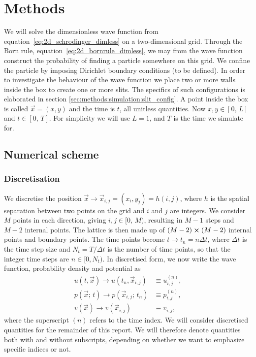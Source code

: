 
\section{Methods}\label{sec:methods}

We will solve the dimensionless wave function from equation~\eqref{eq:2d_schrodinger_dimless} on a two-dimensional grid. Through the Born rule, equation~\eqref{eq:2d_bornrule_dimless}, we may from the wave function construct the probability of finding a particle somewhere on this grid. We confine the particle by imposing Dirichlet boundary conditions (to be defined). In order to investigate the behaviour of the wave function we place two or more walls inside the box to create one or more slits. The specifics of such configurations is elaborated in section \ref{sec:methods:simulation:slit_config}. A point inside the box is called $\vec{x} =(x, y)$ and the time is $t$, all unitless quantities. Now $x, y \in [0,\,L]$ and $t\in[0,\,T]$. For simplicity we will use $L=1$, and $T$ is the time we simulate for. 

\subsection{Numerical scheme}\label{sec:methods:numerical_scheme}

    \subsubsection{Discretisation}\label{sec:methods:numerical_scheme:discretisation}
        We discretise the position $\vec{x} \to \vec{x}_{i,j} = (x_i, y_j) = h(i,j)$, where $h$ is the spatial separation between two points on the grid and $i$ and $j$ are integers. We consider $M$ points in each direction, giving $i, j \in [0,\, M)$, resulting in $M-1$ steps and $M-2$ internal points. The lattice is then made up of $(M-2) \cross (M-2)$ internal points and boundary points. The time points become $t\to t_n=n\Delta t$, where $\Delta t$ is the time step size and $N_t = T/\Delta t$ is the number of time points, so that the integer time steps are $n\in[0, N_t)$. In discretised form, we now write the wave function, probability density and potential as 
        \begin{align}
            u(t, \vec{x}) \to u(t_n, \vec{x}_{i,j}) &\equiv u_{i,j}^{(n)}, \\ 
            p(\vec{x};\, t) \to p(\vec{x}_{i,j};\, t_n) &\equiv p_{i,j}^{(n)}, \\
            v(\vec{x}) \to v(\vec{x}_{i,j})&\equiv v_{i,j}, 
        \end{align}
        where the superscript $(n)$ refers to the time index. We will consider discretised quantities for the remainder of this report. We will therefore denote quantities both with and without subscripts, depending on whether we want to emphasize specific indices or not.  


